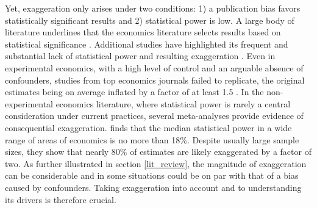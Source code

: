 			Yet, exaggeration only arises under two conditions: 1) a publication bias favors statistically significant results and 2) statistical power is low. A large body of literature underlines that the economics literature selects results based on statistical significance \citep[for instance]{rosenthal_file_1979, brodeur_star_2016, andrews_identification_2019, abadie_statistical_2020, brodeur_methods_2020}. Additional studies have highlighted its frequent and substantial lack of statistical power and resulting exaggeration \citep{ioannidis_power_2017, ferraro_featureis_2020}. %
			Even in experimental economics, with a high level of control and an arguable absence of confounders, studies from top economics journals failed to replicate, the original estimates being on average inflated by a factor of at least 1.5 \citep{camerer_evaluating_2016}. In the non-experimental economics literature, where statistical power is rarely a central consideration under current practices, several meta-analyses provide evidence of consequential exaggeration. \cite{ioannidis_power_2017} finds that the median statistical power in a wide range of areas of economics is no more than 18\%. Despite %
			usually large sample sizes, they show that nearly 80\% of estimates are likely exaggerated by a factor of two. 
			As further illustrated in section \ref{lit_review}, the magnitude of exaggeration can be considerable and in some situations could be on par with that of a bias caused by confounders.
			Taking exaggeration into account and to understanding its drivers is therefore crucial.
			
